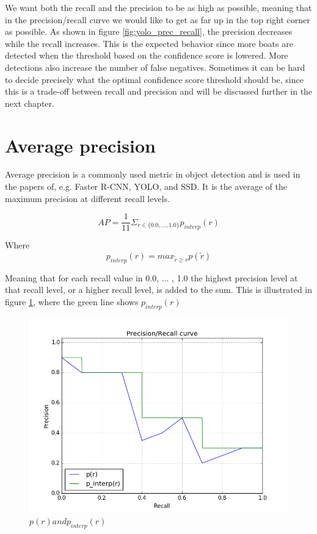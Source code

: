 We want both the recall and the precision to be as high as possible, meaning that in the precision/recall curve we would like to get as far up in the top right corner as possible. As shown in figure \ref{fig:yolo_prec_recall}, the precision decreases while the recall increases. This is the expected behavior since more boats are detected when the threshold based on the confidence score is lowered. More detections also increase the number of false negatives. Sometimes it can be hard to decide precisely what the optimal confidence score threshold should be, since this is a trade-off between recall and precision and will be discussed further in the next chapter. 



\section{Average precision}
Average precision is a commonly used metric in object detection and is used in the papers of, e.g. Faster R-CNN, YOLO, and SSD. It is the average of the maximum precision at different recall levels.

\begin{equation}
    AP = \frac{1}{11} \Sigma_{r \in \{0.0, ... , 1.0\}} p_{interp}(r)
\end{equation}

Where
\begin{equation}
    p_{interp}(r) = max_{\tilde{r} \geq r} p(\tilde{r})
\end{equation}

Meaning that for each recall value in {0.0, ... , 1.0} the highest precision level at that recall level, or a higher recall level, is added to the sum. This is illustrated in figure \ref{fig:p_interp}, where the green line shows $p_{interp}(r)$

\begin{figure}[h!]
    \centering
    \includegraphics[scale=0.5]{fig/p_interp.png}
    \caption{$p(r) and p_{interp}(r)$}
    \label{fig:p_interp}
\end{figure}


